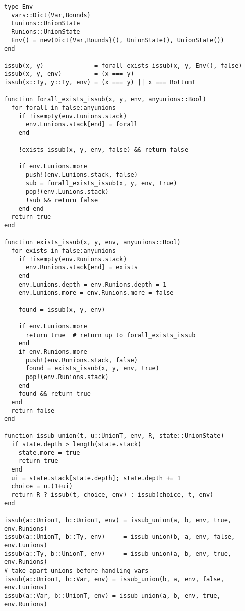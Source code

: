 \begin{singlespace}
\begin{lstlisting}[style=customjulia]
type Env
  vars::Dict{Var,Bounds}
  Lunions::UnionState
  Runions::UnionState
  Env() = new(Dict{Var,Bounds}(), UnionState(), UnionState())
end

issub(x, y)              = forall_exists_issub(x, y, Env(), false)
issub(x, y, env)         = (x === y)
issub(x::Ty, y::Ty, env) = (x === y) || x === BottomT

function forall_exists_issub(x, y, env, anyunions::Bool)
  for forall in false:anyunions
    if !isempty(env.Lunions.stack)
      env.Lunions.stack[end] = forall
    end

    !exists_issub(x, y, env, false) && return false

    if env.Lunions.more
      push!(env.Lunions.stack, false)
      sub = forall_exists_issub(x, y, env, true)
      pop!(env.Lunions.stack)
      !sub && return false
    end end
  return true
end

function exists_issub(x, y, env, anyunions::Bool)
  for exists in false:anyunions
    if !isempty(env.Runions.stack)
      env.Runions.stack[end] = exists
    end
    env.Lunions.depth = env.Runions.depth = 1
    env.Lunions.more = env.Runions.more = false

    found = issub(x, y, env)

    if env.Lunions.more
      return true  # return up to forall_exists_issub
    end
    if env.Runions.more
      push!(env.Runions.stack, false)
      found = exists_issub(x, y, env, true)
      pop!(env.Runions.stack)
    end
    found && return true
  end
  return false
end

function issub_union(t, u::UnionT, env, R, state::UnionState)
  if state.depth > length(state.stack)
    state.more = true
    return true
  end
  ui = state.stack[state.depth]; state.depth += 1
  choice = u.(1+ui)
  return R ? issub(t, choice, env) : issub(choice, t, env)
end

issub(a::UnionT, b::UnionT, env) = issub_union(a, b, env, true, env.Runions)
issub(a::UnionT, b::Ty, env)     = issub_union(b, a, env, false, env.Lunions)
issub(a::Ty, b::UnionT, env)     = issub_union(a, b, env, true, env.Runions)
# take apart unions before handling vars
issub(a::UnionT, b::Var, env) = issub_union(b, a, env, false, env.Lunions)
issub(a::Var, b::UnionT, env) = issub_union(a, b, env, true, env.Runions)


\end{lstlisting}
\end{singlespace}
